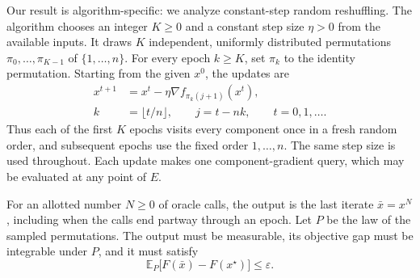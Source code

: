 \documentclass[10pt]{article}
\theoremstyle{definition}
\begin{document}
Our result is algorithm-specific: we analyze constant-step random reshuffling. The algorithm chooses an integer $K\geq0$ and a constant step size $\eta>0$ from the available inputs. It draws $K$ independent, uniformly distributed permutations $\pi_0,\ldots,\pi_{K-1}$ of $\{1,\ldots,n\}$. For every epoch $k\geq K$, set $\pi_k$ to the identity permutation. Starting from the given $x^0$, the updates are
\[
\begin{aligned}
x^{t+1}&=x^t-\eta\nabla f_{\pi_k(j+1)}(x^t),\\
k&=\lfloor t/n\rfloor,\qquad j=t-nk,
\qquad t=0,1,\ldots.
\end{aligned}
\]
Thus each of the first $K$ epochs visits every component once in a fresh random order, and subsequent epochs use the fixed order $1,\ldots,n$. The same step size is used throughout. Each update makes one component-gradient query, which may be evaluated at any point of $E$.

For an allotted number $N\geq0$ of oracle calls, the output is the last iterate $\bar{x}=x^N$, including when the calls end partway through an epoch. Let $P$ be the law of the sampled permutations. The output must be measurable, its objective gap must be integrable under $P$, and it must satisfy
\[
\mathbb{E}_{P}\bigl[F(\bar{x})-F(x^\star)\bigr]\leq\varepsilon.
\]
\end{document}
